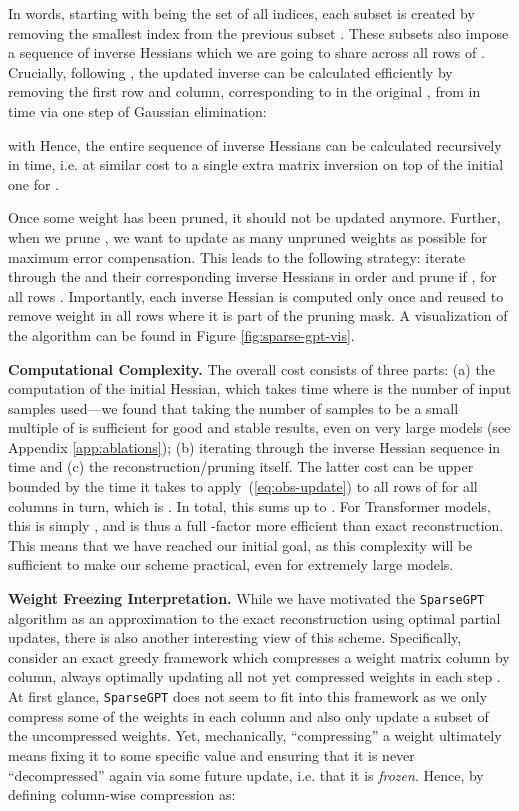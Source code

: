 \documentclass{article}
\theoremstyle{plain}
\theoremstyle{definition}
\theoremstyle{remark}
\newcommand{\sparsegpt}[1]{\texttt{SparseGPT}}
\begin{document}
In words, starting with  being the set of all indices, each subset  is created by removing the smallest index from the previous subset . These subsets also impose a sequence of inverse Hessians  which we are going to share across all rows of . Crucially, following \cite{frantar2022obc}, the updated inverse  can be calculated efficiently by removing the first row and column, corresponding to  in the original , from  in  time via one step of Gaussian elimination:

\noindent with 
Hence, the entire sequence of  inverse Hessians can be calculated recursively in  time, i.e. at similar cost to a single extra matrix inversion on top of the initial one for .

Once some weight  has been pruned, it should not be updated anymore. Further, when we prune , we want to update as many unpruned weights as possible for maximum error compensation. This leads to the following strategy: iterate through the  and their corresponding inverse Hessians  in order and prune  if , for all rows . Importantly, each inverse Hessian  is computed only once and reused to remove weight  in all rows where it is part of the pruning mask. A visualization of the algorithm can be found in Figure \ref{fig:sparse-gpt-vis}.

\textbf{Computational Complexity.} 
The overall cost consists of three parts: (a) the computation of the initial Hessian, which takes time  where  is the number of input samples used---we found that taking the number of samples  to be a small multiple of  is sufficient for good and stable results, even on very large models (see Appendix \ref{app:ablations}); (b) iterating through the inverse Hessian sequence in time  and (c) the reconstruction/pruning itself. The latter cost can be upper bounded by the time it takes to apply~(\ref{eq:obs-update}) to all  rows of  for all  columns in turn, which is . In total, this sums up to . For Transformer models, this is simply , and is thus a full -factor more efficient than exact reconstruction. This means that we have reached our initial goal, as this complexity will be sufficient to make our scheme practical, even for extremely large models.

\textbf{Weight Freezing Interpretation.} While we have motivated the \sparsegpt{} algorithm as an  approximation to the exact reconstruction using optimal partial updates, there is also another interesting view of this scheme. Specifically, consider an exact greedy framework which compresses a weight matrix column by column, always optimally updating all not yet compressed weights in each step \cite{frantar2022obc, frantar2022gptq}. At first glance, \sparsegpt{} does not seem to fit into this framework as we only compress some of the weights in each column and also only update a subset of the uncompressed weights. Yet, mechanically, ``compressing'' a weight ultimately means fixing it to some specific value and ensuring that it is never ``decompressed'' again via some future update, i.e. that it is \emph{frozen}. Hence, by defining column-wise compression as:
\end{document}
